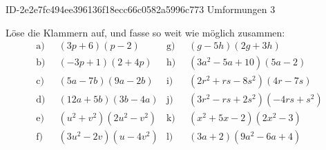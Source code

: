 \begin{exercise}
      {ID-2e2e7fc494ee396136f18ecc66c0582a5996c773}
      {Umformungen 3}
  \ifproblem\problem\par
    \newcommand{\gap}{\;\;}%
    Löse die Klammern auf, und fasse so weit wie möglich zusammen:
    \begin{align*}
      \text{a)}\gap & (3p+6)(p-2) &
      \text{g)}\gap & (g-5h)(2g+3h)
      \\
      \text{b)}\gap & (-3p+1)(2+4p) &
      \text{h)}\gap & (3a^2-5a+10)(5a-2)
      \\
      \text{c)}\gap & (5a-7b)(9a-2b) &
      \text{i)}\gap & (2r^2+rs-8s^2)(4r-7s)
      \\
      \text{d)}\gap & (12a+5b)(3b-4a) &
      \text{j)}\gap & (3r^2-rs+2s^2)(-4rs+s^2)
      \\
      \text{e)}\gap & (u^2+v^2)(2u^2-v^2) &
      \text{k)}\gap & (x^2+5x-2)(2x^2-3)
      \\
      \text{f)}\gap & (3u^2-2v)(u-4v^2) &
      \text{l)}\gap & (3a+2)(9a^2-6a+4)
    \end{align*}
  \fi
  \ifoutcome\outcome\par
    \newcommand{\toprow}[2][20em]
    {%
      \makebox[#1][l]
      {%
        \ensuremath
        {%
          \displaystyle
          \phantom{\,=\:\,}%
          #2%
        }%
      }%
    }%
    \newcommand{\solutionA}[1]
    {%
      \begin{equation*}
        \begin{split}
          \text{a)} &\toprow[#1]{(3p+6)(p-2)}  \\
                    &=           3p^2-6p+6p-12 \\
                    &=           3p^2-12
        \end{split}
      \end{equation*}
    }%
    \newcommand{\solutionB}[1]
    {%
      \begin{equation*}
        \begin{split}
          \text{b)} &\toprow[#1]{(-3p+1)(2+4p)} \\
                    &=           -6p-12p^2+2+4p \\
                    &=           -12p^2-6p+4p+2 \\
                    &=           -12p^2-2p+2
        \end{split}

\end{equation*}}
\end{exercise}
